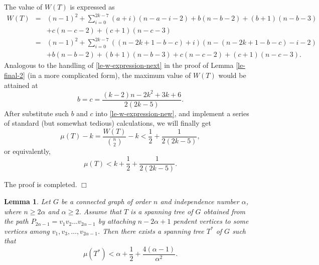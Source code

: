 \documentclass[12pt]{article}
\newtheorem{Lemma}{Lemma}[section]
\newenvironment {Proof} {\noindent {\bf Proof.}}{\hspace*{\fill}$\Box$\par\vspace{4mm}}
\begin{document}
\begin{Proof}
The value of $W(T)$ is expressed as
\begin{eqnarray} \label{le-w-expression-new}
W (T) &=& (n-1)^2 + \sum_{i = 0}^{2k - 7}(a + i)(n - a - i - 2)+ b(n -b  - 2) + (b + 1)(n - b - 3) \nonumber\\
&&+ c(n - c  - 2) + (c + 1)(n - c - 3) \nonumber \\
&=& (n-1)^2 + \sum_{i = 0}^{2k -7}((n - 2k + 1 - b - c) + i)(n - (n - 2k + 1 - b - c) - i - 2)\nonumber\\
&&+ b(n -b  - 2) + (b + 1)(n - b - 3) + c(n - c  - 2) + (c + 1)(n - c - 3).
\end{eqnarray}
Analogous to the handling of \eqref{le-w-expression-next} in the proof of Lemma \ref{le-final-2} (in a more complicated form), the maximum value of $W(T)$ would be attained at
$$
b = c = \frac{(k-2)n - 2k^2 + 3k + 6}{2(2k -5 )}.
$$
After substitute such $b$ and $c$ into \eqref{le-w-expression-new}, and implement a series of standard (but somewhat tedious) calculations, we will finally get
$$
\mu (T) - k =  \frac{W(T)}{\binom{n}{2}} - k < \frac{1}{2} + \frac{1}{2(2k-5)},
$$
or equivalently,
$$
\mu (T) < k + \frac{1}{2} + \frac{1}{2(2k-5)}.
$$

The proof is completed.
\end{Proof}


\begin{Lemma} \label{le-key}
Let $G$ be a connected graph of order $n$ and independence number $\alpha$, where $n \ge 2 \alpha$ and $\alpha \ge 2$. Assume that $T$ is a spanning tree of $G$ obtained from the path $P_{2\alpha-1} = v_1 v_2 \dots v_{2\alpha-1}$ by attaching $n - 2\alpha + 1$ pendent vertices to some vertices among $v_1, v_3, \dots, v_{2\alpha-1}$.
Then there exists a spanning tree $T^*$ of $G$ such that
$$
\mu(T^*) < \alpha + \frac{1}{2} + \frac{4(\alpha-1)}{\alpha^2}.
$$
\end{Lemma}
\end{document}
